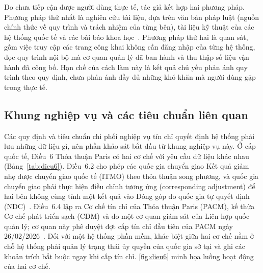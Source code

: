 Do chưa tiếp cận được người dùng thực tế, tác giả kết hợp hai phương pháp. Phương pháp thứ nhất là nghiên cứu tài liệu, dựa trên văn bản pháp luật (nguồn chính thức về quy trình và trách nhiệm của từng bên), tài liệu kỹ thuật của các hệ thống quốc tế và các bài báo khoa học~\cite{sipthorpe2022blockchain,vaccargiu2026blockchain}. Phương pháp thứ hai là quan sát, gồm việc truy cập các trang công khai không cần đăng nhập của từng hệ thống, đọc quy trình nội bộ mà cơ quan quản lý đã ban hành và thu thập số liệu vận hành đã công bố. Hạn chế của cách làm này là kết quả chủ yếu phản ánh quy trình theo quy định, chưa phản ánh đầy đủ những khó khăn mà người dùng gặp trong thực tế.

\FloatBarrier
\subsection*{Khung nghiệp vụ và các tiêu chuẩn liên quan}
\label{sec:boicanh}
\label{sec:sodangky}

Các quy định và tiêu chuẩn chi phối nghiệp vụ tín chỉ quyết định hệ thống phải lưu những dữ liệu gì, nên phần khảo sát bắt đầu từ khung nghiệp vụ này. Ở cấp quốc tế, Điều~6 Thỏa thuận Paris có hai cơ chế với yêu cầu dữ liệu khác nhau (Bảng~\ref{tab:dieu6}). Điều~6.2 cho phép các quốc gia chuyển giao Kết quả giảm nhẹ được chuyển giao quốc tế (ITMO) theo thỏa thuận song phương, và quốc gia chuyển giao phải thực hiện điều chỉnh tương ứng (corresponding adjustment) để hai bên không cùng tính một kết quả vào Đóng góp do quốc gia tự quyết định (NDC)~\cite{unfccc2022cma3,schneider2019double}. Điều~6.4 lập ra Cơ chế tín chỉ của Thỏa thuận Paris (PACM), kế thừa Cơ chế phát triển sạch (CDM) và do một cơ quan giám sát của Liên hợp quốc quản lý; cơ quan này phê duyệt đợt cấp tín chỉ đầu tiên của PACM ngày 26/02/2026~\cite{unfccc2022cma3,unfccc2026pacm}. Đối với một hệ thống phần mềm, khác biệt giữa hai cơ chế nằm ở chỗ hệ thống phải quản lý trạng thái ủy quyền của quốc gia sở tại và ghi các khoản trích bắt buộc ngay khi cấp tín chỉ. \autoref{fig:dieu6} minh họa luồng hoạt động của hai cơ chế.

